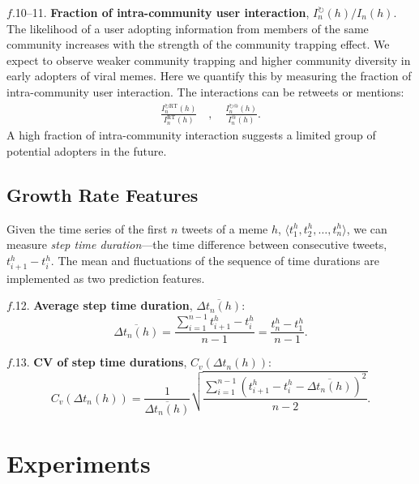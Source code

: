 \documentclass[letterpaper]{article}
\begin{document}
\noindent $f$.10--11. \textbf{Fraction of intra-community user interaction},
$I_n^{\circlearrowright}(h)/I_n(h)$.  The likelihood of a user adopting information
from members of the same community increases with the strength of the community
trapping effect. We expect to observe weaker community trapping and higher
community diversity in early adopters of viral memes.  Here we quantify this by
measuring the fraction of intra-community user interaction. The interactions
can be retweets or mentions:
%
\begin{eqnarray*}
%
\frac{I^{\circlearrowright\mathrm{RT}}_n(h)}{I^\mathrm{RT}_n(h)} \quad , \quad
%
\frac{I^{\circlearrowright\mathrm{@}}_n(h)}{I^\mathrm{@}_n(h)}.
%
\end{eqnarray*}
%
A high fraction of intra-community interaction suggests a limited group of potential adopters in the future. %



\subsection{Growth Rate Features}

Given the time series of the first $n$ tweets of a meme $h$, $\langle t_1^h,
t_2^h, \dots, t_n^h \rangle$, we can measure \emph{step time duration}---the
time difference between consecutive tweets, $t_{i+1}^h - t_i^h$. The mean 
and fluctuations of the sequence of time durations are implemented as two prediction
features.

\noindent $f$.12. \textbf{Average step time duration}, $\overline{\Delta t_n(h)}$:
%
\begin{equation*}
%
\overline{\Delta t_n(h)} = \frac{\sum_{i=1}^{n-1} t_{i+1}^h - t_i^h}{n-1}  =
\frac{t^h_n - t^h_1}{n-1}.
%
\end{equation*} 

\noindent $f$.13. \textbf{CV of step time durations}, $C_v(\Delta t_n(h))$:
%
\begin{equation*}
%
C_v(\Delta t_n(h)) = \frac{1}{\overline{\Delta
t_n(h)}}\sqrt{\frac{\sum_{i=1}^{n-1} (t_{i+1}^h - t_i^h - \overline{\Delta
t_n(h)})^2}{n-2}}.
%
\end{equation*}



\section{Experiments}
\label{sec:exp}
\end{document}
